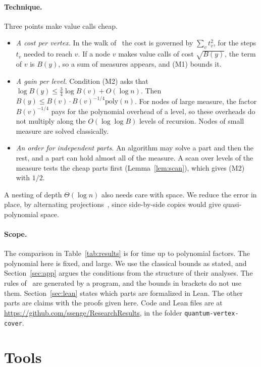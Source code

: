 \documentclass[11pt]{article}
\theoremstyle{definition}
\theoremstyle{remark}
\newcommand{\poly}{\mathrm{poly}}
\begin{document}
\paragraph{Technique.} Three points make value calls cheap.
\begin{itemize}[leftmargin=1.5em]
\item \emph{A cost per vertex.} In the walk of~\cite{Vih25} the cost is governed by $\sum_v t_v^2$, for the steps $t_v$ needed to reach $v$. If a node $v$ makes value calls of cost $\sqrt{B(y)}$, the term of $v$ is $B(y)$, so a sum of measures appears, and (M1) bounds it.
\item \emph{A gain per level.} Condition (M2) asks that $\log B(y)\le\frac34\log B(v)+O(\log n)$. Then $B(y)\le B(v)\cdot B(v)^{-1/4}\poly(n)$. For nodes of large measure, the factor $B(v)^{-1/4}$ pays for the polynomial overhead of a level, so these overheads do not multiply along the $O(\log\log B)$ levels of recursion. Nodes of small measure are solved classically.
\item \emph{An order for independent parts.} An algorithm may solve a part and then the rest, and a part can hold almost all of the measure. A scan over levels of the measure tests the cheap parts first (Lemma~\ref{lem:scan}), which gives (M2) with $1/2$.
\end{itemize}
A nesting of depth $\Theta(\log n)$ also needs care with space. We reduce the error in place, by alternating projections~\cite{MW05}, since side-by-side copies would give quasi-polynomial space.

\paragraph{Scope.} The comparison in Table~\ref{tab:results} is for time up to polynomial factors. The polynomial here is fixed, and large. We use the classical bounds as stated, and Section~\ref{sec:app} argues the conditions from the structure of their analyses. The rules of~\cite{CGHMZ25} are generated by a program, and the bounds in brackets do not use them. Section~\ref{sec:lean} states which parts are formalized in Lean. The other parts are claims with the proofs given here. Code and Lean files are at \url{https://github.com/ssenge/ResearchResults}, in the folder \texttt{quantum-vertex-cover}.

\section{Tools}
\end{document}
